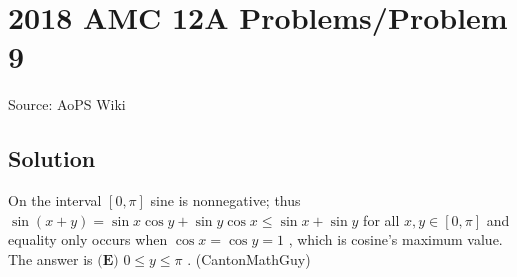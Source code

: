 \documentclass[12pt]{article}
\begin{document}
\section*{{2018 AMC 12A Problems/Problem 9}}
Source: AoPS Wiki

\subsection*{Solution}
On the interval $[0, \pi]$ sine is nonnegative; thus $\sin(x + y) = \sin x \cos y + \sin y \cos x \le \sin x + \sin y$ for all $x, y \in [0, \pi]$ and equality only occurs when $\cos x = \cos y = 1$ , which is cosine's maximum value. The answer is $\boxed{\textbf{(E) } 0\le y\le \pi}$ . (CantonMathGuy)
\end{document}
